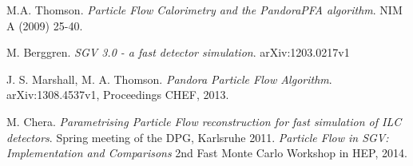 \documentclass[a4paper,12pt]{article}
\begin{document}
\begin{thebibliography}{9}
M.A. Thomson.
\textit{Particle Flow Calorimetry and the PandoraPFA algorithm}. 
NIM A (2009) 25-40.
 
M. Berggren. 
\textit{SGV 3.0 - a fast detector simulation}.
arXiv:1203.0217v1

J. S. Marshall, M. A. Thomson. 
\textit{Pandora Particle Flow Algorithm}.
arXiv:1308.4537v1, Proceedings CHEF, 2013.

M. Chera. 
\textit{Parametrising Particle Flow reconstruction for fast simulation of ILC detectors}.
Spring meeting of the DPG, Karlsruhe 2011.
\textit{Particle Flow in SGV: Implementation and Comparisons}
2nd Fast Monte Carlo Workshop in HEP, 2014.

\end{thebibliography}
\end{document}
